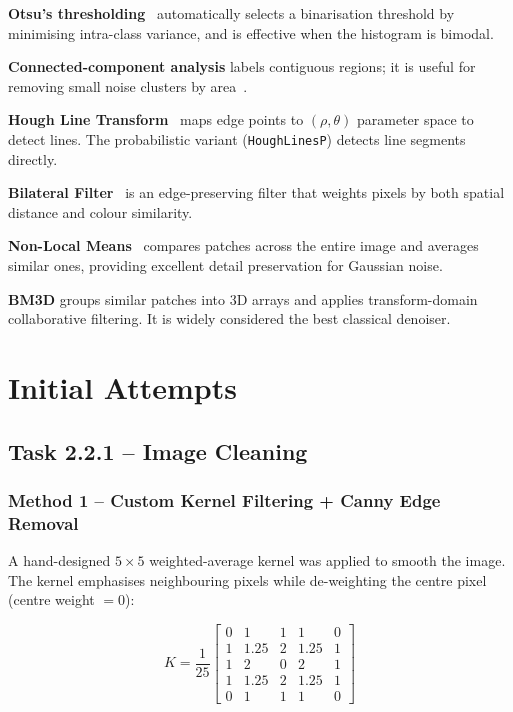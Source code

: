 \documentclass[conference, twocolumn]{IEEEtran}
\begin{document}
\textbf{Otsu's thresholding}~\cite{opencv} automatically selects a binarisation threshold by minimising intra-class variance, and is effective when the histogram is bimodal.

\textbf{Connected-component analysis} labels contiguous regions; it is useful for removing small noise clusters by area~\cite{opencv}.

\textbf{Hough Line Transform}~\cite{opencv} maps edge points to $(\rho, \theta)$ parameter space to detect lines. The probabilistic variant (\texttt{HoughLinesP}) detects line segments directly.

\textbf{Bilateral Filter}~\cite{opencv} is an edge-preserving filter that weights pixels by both spatial distance and colour similarity.

\textbf{Non-Local Means}~\cite{opencv} compares patches across the entire image and averages similar ones, providing excellent detail preservation for Gaussian noise.

\textbf{BM3D} groups similar patches into 3D arrays and applies transform-domain collaborative filtering. It is widely considered the best classical denoiser.

\section{Initial Attempts}

\subsection{Task 2.2.1 -- Image Cleaning}

\subsubsection{Method 1 -- Custom Kernel Filtering + Canny Edge Removal}

A hand-designed $5\times5$ weighted-average kernel was applied to smooth the image. The kernel emphasises neighbouring pixels while de-weighting the centre pixel (centre weight $= 0$):

\begin{equation}
K = \frac{1}{25} \begin{bmatrix} 0 & 1 & 1 & 1 & 0 \\ 1 & 1.25 & 2 & 1.25 & 1 \\ 1 & 2 & 0 & 2 & 1 \\ 1 & 1.25 & 2 & 1.25 & 1 \\ 0 & 1 & 1 & 1 & 0 \end{bmatrix}
\end{equation}
\end{document}
